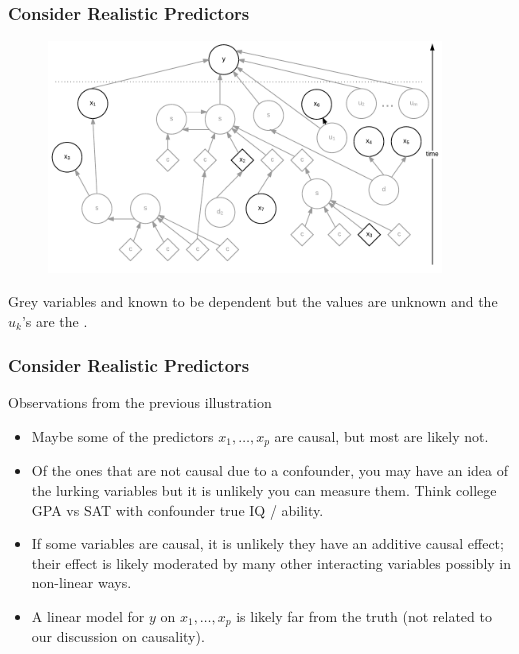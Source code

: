 \documentclass[handout]{beamer}
\begin{document}
\begin{frame}\frametitle{Consider Realistic Predictors}

\begin{figure}
\centering
\includegraphics[width=4.1in]{realistic_predictors}
\end{figure}

Grey variables and known to be dependent but the values are unknown and the $u_k$'s are the .

\end{frame}

\begin{frame}\frametitle{Consider Realistic Predictors}

Observations from the previous illustration

\begin{itemize}
\item Maybe some of the predictors $x_1, \ldots, x_p$ are causal, but most are likely not.
\item Of the ones that are not causal due to a confounder, you may have an idea of the lurking variables but it is unlikely you can measure them. Think college GPA vs SAT with confounder true IQ / ability.
\item If some variables are causal, it is unlikely they have an additive causal effect; their effect is likely moderated by many other interacting variables possibly in non-linear ways.
\item A linear model for $y$ on $x_1, \ldots, x_p$ is likely far from the truth (not related to our discussion on causality).
\end{itemize}

\end{frame}
\end{document}
